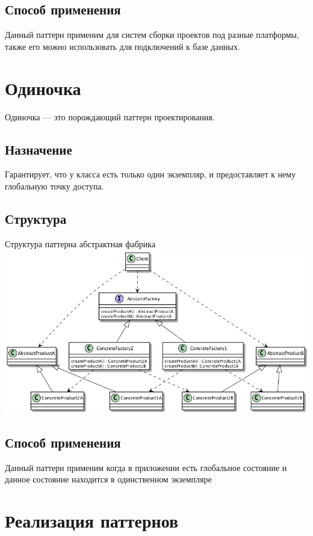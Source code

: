 \documentclass[PI,LAB]{HSEUniversity}
\begin{document}
\section{Способ применения}
Данный паттерн применим для систем сборки проектов под разные платформы, также его можно использовать для подключений к базе данных.
\chapter{Одиночка}
Одиночка — это порождающий паттерн проектирования.
\section{Назначение}
Гарантирует, что у класса есть только один экземпляр, и предоставляет к нему глобальную точку доступа.
\section{Структура}

\begin{FIGURE}[h]{Структура паттерна абстрактная фабрика\label{fig:example-figure}}
	\includegraphics[width=\textwidth]{../out/diagrams/factory/flex}
\end{FIGURE}

\section{Способ применения}
Данный паттерн применим когда в приложении есть глобальное состояние и данное состояние находится в одинственном экземпляре
\chapter{Реализация паттернов}
\end{document}
